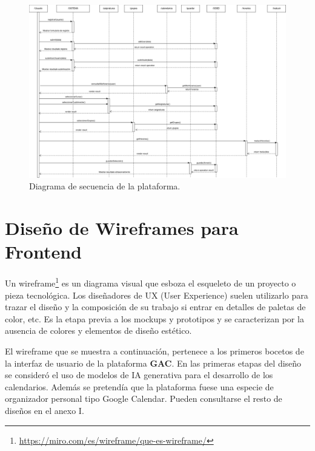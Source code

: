 \begin{figure}[H]
    \centering
    \includegraphics[width=1\textwidth]{./imagenes/Secuencia_Diagrama.png}
    \caption{Diagrama de secuencia de la plataforma.}
\end{figure}

\section{Diseño de Wireframes para Frontend}

Un wireframe\footnote{\url{https://miro.com/es/wireframe/que-es-wireframe/}} es un diagrama visual que esboza el esqueleto de un proyecto o pieza tecnológica. Los diseñadores de UX (User Experience) suelen utilizarlo para trazar el diseño y la composición de su trabajo si entrar en detalles de paletas de color, etc. Es la etapa previa a los mockups y prototipos y se caracterizan por la ausencia de colores y elementos de diseño estético.\newline

El wireframe que se muestra a continuación, pertenece a los primeros bocetos de la interfaz de usuario de la plataforma \textbf{GAC}. En las primeras etapas del diseño se consideró el uso de modelos de IA generativa para el desarrollo de los calendarios. Además se pretendía que la plataforma fuese una especie de organizador personal tipo Google Calendar. Pueden consultarse el resto de diseños en el anexo I.\newline


